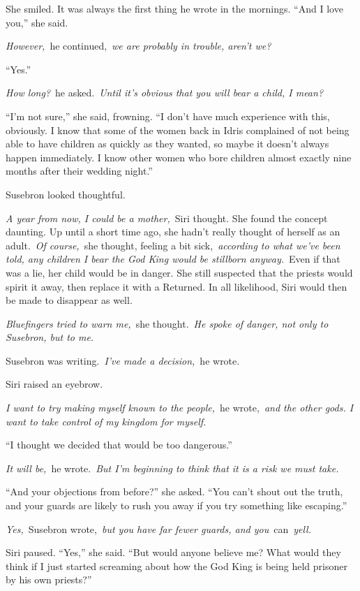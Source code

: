 She smiled. It was always the first thing he wrote in the mornings. “And I love you,” she said.

\textit{However,}~he continued,~\textit{we are probably in trouble, aren’t we?}

“Yes.”

\textit{How long?}~he asked.~\textit{Until it’s obvious that you will bear a child, I mean?}

“I’m not sure,” she said, frowning. “I don’t have much experience with this, obviously. I know that some of the women back in Idris complained of not being able to have children as quickly as they wanted, so maybe it doesn’t always happen immediately. I know other women who bore children almost exactly nine months after their wedding night.”

Susebron looked thoughtful.

\textit{A year from now, I could be a mother,}~Siri thought. She found the concept daunting. Up until a short time ago, she hadn’t really thought of herself as an adult.~\textit{Of course,}~she thought, feeling a bit sick,~\textit{according to what we’ve been told, any children I bear the God King would be stillborn anyway.}~Even if that was a lie, her child would be in danger. She still suspected that the priests would spirit it away, then replace it with a Returned. In all likelihood, Siri would then be made to disappear as well.

\textit{Bluefingers tried to warn me,}~she thought.~\textit{He spoke of danger, not only to Susebron, but to me.}

Susebron was writing.~\textit{I’ve made a decision,}~he wrote.

Siri raised an eyebrow.

\textit{I want to try making myself known to the people,}~he wrote,~\textit{and the other gods. I want to take control of my kingdom for myself.}

“I thought we decided that would be too dangerous.”

\textit{It will be,}~he wrote.~\textit{But I’m beginning to think that it is a risk we must take.}

“And your objections from before?” she asked. “You can’t shout out the truth, and your guards are likely to rush you away if you try something like escaping.”

\textit{Yes,}~Susebron wrote,~\textit{but you have far fewer guards, and you}~can~\textit{yell.}

Siri paused. “Yes,” she said. “But would anyone believe me? What would they think if I just started screaming about how the God King is being held prisoner by his own priests?”

